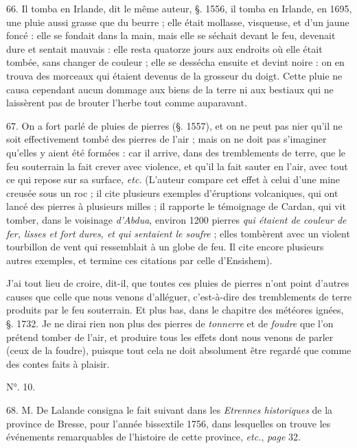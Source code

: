 \documentclass[a4paper, 11pt, oneside, polutonikogreek, french]{article}
\begin{document}
66. Il tomba en Irlande, dit le même auteur, §. 1556, il tomba en Irlande, en 1695, une pluie aussi grasse que du beurre ; elle était mollasse, visqueuse, et d'un jaune foncé : elle se fondait dans la main, mais elle se séchait devant le feu, devenait dure et sentait mauvais : elle resta quatorze jours aux endroits où elle était tombée, sans changer de couleur ; elle se dessécha ensuite et devint noire : on en trouva des morceaux qui étaient devenus de la grosseur du doigt. Cette pluie ne causa cependant aucun dommage aux biens de la terre ni aux bestiaux qui ne laissèrent pas de brouter l'herbe tout comme auparavant.

67. On a fort parlé de pluies de pierres (§. 1557), et on ne peut pas nier qu'il ne soit effectivement tombé des pierres de l'air ; mais on ne doit pas s'imaginer qu'elles y aient été formées : car il arrive, dans des tremblements de terre, que le feu souterrain la fait crever avec violence, et qu'il la fait sauter en l'air, avec tout ce qui repose sur sa surface, \emph{etc.} (L'auteur compare cet effet à celui d'une mine creusée sous un roc ; il cite plusieurs exemples d'éruptions volcaniques, qui ont lancé des pierres à plusieurs milles ; il rapporte le témoignage de Cardan, qui vit tomber, dans le voisinage \emph{d'Abdua}, environ 1200 pierres \emph{qui étaient de couleur de fer, lisses et fort dures, et qui sentaient le soufre} ; elles tombèrent avec un violent tourbillon de vent qui ressemblait à un globe de feu. Il cite encore plusieurs autres exemples, et termine ces citations par celle d'Ensishem).

\og J'ai tout lieu de croire, dit-il, que toutes ces pluies de pierres n'ont point d'autres causes que celle que nous venons d'alléguer, c'est-à-dire des tremblements de terre produits par le feu souterrain. Et plus bas, dans le chapitre des météores ignées, §. 1732. \fg Je ne dirai rien non plus des pierres de \emph{tonnerre} et de \emph{foudre} que l'on prétend tomber de l'air, et produire tous les effets dont nous venons de parler (ceux de la foudre), puisque tout cela ne doit absolument être regardé que comme des contes faits à plaisir.

\begin{center}
N°. 10.
\end{center}

68. M. De Lalande consigna le fait suivant dans les \emph{Etrennes historiques} de la province de Bresse, pour l'année bissextile 1756, dans lesquelles on trouve les événements remarquables de l'histoire de cette province, \emph{etc.}, \emph{page} 32.
\end{document}
